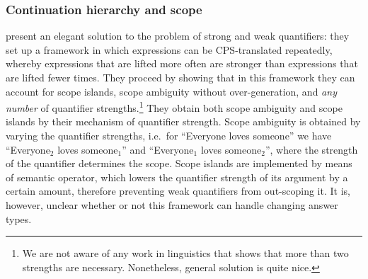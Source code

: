 \subsubsection{Continuation hierarchy and scope}
\citet{kiselyov2014} present an elegant solution to the problem of
strong and weak quantifiers: they set up a framework in which
expressions can be CPS-translated repeatedly, whereby expressions that
are lifted more often are stronger than expressions that are lifted
fewer times. They proceed by showing that in this framework they can
account for scope islands, scope ambiguity without over-generation,
and \emph{any number} of quantifier strengths.\footnote{%
  We are not aware of any work in linguistics that shows that more
  than two strengths are necessary. Nonetheless,
   general solution is quite nice.
}
They obtain both scope ambiguity and scope islands by their mechanism
of quantifier strength. Scope ambiguity is obtained by varying the
quantifier strengths, i.e.\ for ``Everyone loves someone'' we have
``Everyone$_2$ loves someone$_1$'' and  ``Everyone$_1$ loves
someone$_2$'', where the strength of the quantifier determines the
scope. Scope islands are implemented by means of semantic operator,
which lowers the quantifier strength of its argument by a certain
amount, therefore preventing weak quantifiers from out-scoping it.
It is, however, unclear whether or not this framework can handle
changing answer types.




